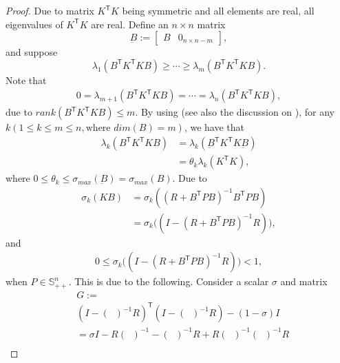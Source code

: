 \documentclass{article}
\newcommand{\transpose}{\mathsf{T}}
\DeclareMathOperator{\tempRBP}{R + B^{\transpose}PB}
\begin{document}
\begin{proof}
    Due to matrix $K^{\transpose}K$ being symmetric and all elements are real, all eigenvalues of $K^{\transpose}K$ are real.
    Define an $n\times n$ matrix
    \begin{equation}
        \underbar{B} := 
        \begin{bmatrix}
            B & 0_{n\times n-m}
        \end{bmatrix},
    \end{equation}
    and suppose
    \begin{equation}
        \lambda_{1}(B^{\transpose}K^{\transpose}KB) \geq \cdots \geq \lambda_{m}(B^{\transpose}K^{\transpose}KB).
    \end{equation}
    Note that
    \begin{align*}
       0 =  \lambda_{m+1}(B^{\transpose}K^{\transpose}KB) = \cdots = \lambda_{n}(B^{\transpose}K^{\transpose}KB),
    \end{align*}
    due to $\textit{rank}(B^{\transpose}K^{\transpose}KB) \leq m$.
    By using \cite[Theorem 4.5.9]{horn_matrix_2013} (see also the discussion on \cite[p.~284]{horn_matrix_2013}), for any $k(1\leq k\leq m\leq n,\text{where $\textit{dim}(B)=m$})$,
    we have that
    \begin{align*}
        \lambda_{k}(B^{\transpose}K^{\transpose}KB) &= \lambda_{k}(\underbar{B}^{\transpose}K^{\transpose}K\underbar{B})\\
        &= \theta_{k}\lambda_{k}(K^{\transpose}K),
    \end{align*}
    where $0\leq \theta_{k} \leq \sigma_{max}(\underbar{B})=\sigma_{max}(B)$.
    Due to
    \begin{align*}
        \sigma_{k}(KB) &= \sigma_{k}((R+B^{\transpose}PB)^{-1}B^{\transpose}PB)\\
        &= \sigma_{k}\bigg((I - (R+B^{\transpose}PB)^{-1}R) \bigg),
    \end{align*}
    and
    \begin{align*}
       0 \leq \sigma_{k}\bigg((I - (R+B^{\transpose}PB)^{-1}R) \bigg) < 1,
    \end{align*}
    when $P \in \mathbb{S}_{++}^{n}$. This is due to the following. Consider a scalar $\sigma$ and matrix
    \begin{align*}
        &G :=\\
        &(I-(\tempRBP)^{-1}R)^{\transpose}(I-(\tempRBP)^{-1}R) - (1-\sigma) I \\
        &= \sigma I - R(\tempRBP)^{-1} - (\tempRBP)^{-1}R + R(\tempRBP)^{-1}(\tempRBP)^{-1}R\\

\end{align*}
\end{proof}
\end{document}
